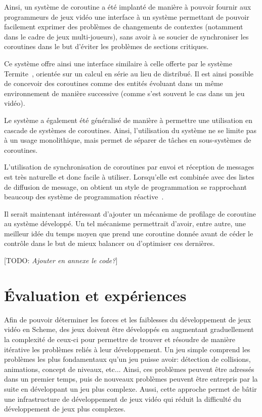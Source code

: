 \documentclass[12pt,oneside,letterpaper,francais]{book}
\newcommand{\todo}[1]{[TODO: {\it #1}]}
\begin{document}
Ainsi, un système de coroutine a été implanté de manière à pouvoir
fournir aux programmeurs de jeux vidéo une interface à un système
permettant de pouvoir facilement exprimer des problèmes de changements
de contextes (notamment dans le cadre de jeux multi-joueurs), sans
avoir à se soucier de synchroniser les coroutines dans le but d'éviter
les problèmes de sections critiques.

Ce système offre ainsi une interface similaire à celle offerte par le
système Termite~\cite{Termite_paper}, orientée sur un calcul en série
au lieu de distribué. Il est ainsi possible de concevoir des
coroutines comme des entités évoluant dans un même environnement de
manière successive (comme s'est souvent le cas dans un jeu vidéo).

Le système a également été généralisé de manière à permettre une
utilisation en cascade de systèmes de coroutines. Ainsi, l'utilisation
du système ne se limite pas à un usage monolithique, mais permet de
séparer de tâches en sous-systèmes de coroutines.

L'utilisation de synchronisation de coroutines par envoi et réception
de messages est très naturelle et donc facile à utiliser. Lorsqu'elle
est combinée avec des listes de diffusion de message, on obtient un
style de programmation se rapprochant beaucoup des système de
programmation réactive~\cite{FRP}.

Il serait maintenant intéressant d'ajouter un mécanisme de profilage
de coroutine au système développé. Un tel mécanisme permettrait
d'avoir, entre autre, une meilleur idée du temps moyen que prend une
coroutine donnée avant de céder le contrôle dans le but de mieux
balancer ou d'optimiser ces dernières.

\todo{Ajouter en annexe le code?}


\chapter{Évaluation et expériences}
\label{Chap:exp}

Afin de pouvoir déterminer les forces et les faiblesses du
développement de jeux vidéo en Scheme, des jeux doivent être
développés en augmentant graduellement la complexité de ceux-ci pour
permettre de trouver et résoudre de manière itérative les problèmes
reliés à leur développement. Un jeu simple comprend les problèmes les
plus fondamentaux qu'un jeu puisse avoir: détection de collisions,
animations, concept de niveaux, etc... Ainsi, ces problèmes peuvent
être adressés dans un premier temps, puis de nouveaux problèmes
peuvent être entrepris par la suite en développant un jeu plus
complexe. Aussi, cette approche permet de bâtir une infrastructure de
développement de jeux vidéo qui réduit la difficulté du développement
de jeux plus complexes.
\end{document}
